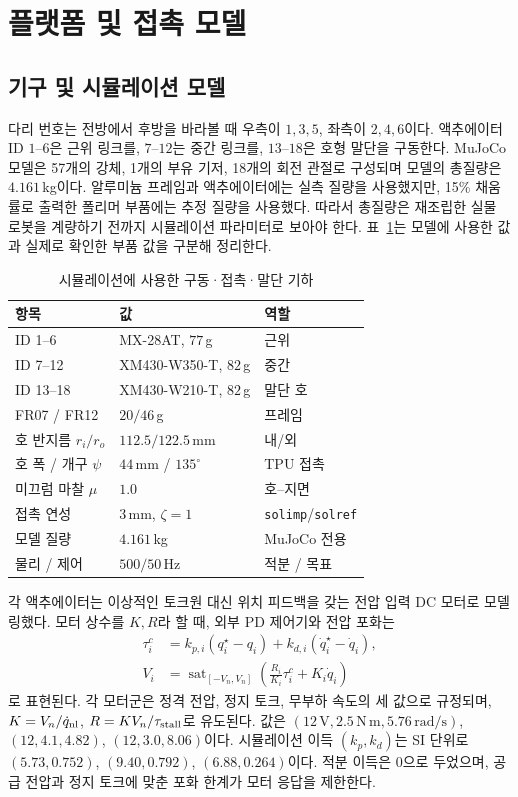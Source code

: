 \section{플랫폼 및 접촉 모델}

\subsection{기구 및 시뮬레이션 모델}

다리 번호는 전방에서 후방을 바라볼 때 우측이 $1,3,5$, 좌측이 $2,4,6$이다.
액추에이터 ID $1$--$6$은 근위 링크를, $7$--$12$는 중간 링크를, $13$--$18$은
호형 말단을 구동한다. MuJoCo 모델은 57개의 강체, 1개의 부유 기저, 18개의 회전
관절로 구성되며 모델의 총질량은 $4.161\,$kg이다. 알루미늄 프레임과 액추에이터에는
실측 질량을 사용했지만, 15\% 채움률로 출력한 폴리머 부품에는 추정 질량을
사용했다. 따라서 총질량은 재조립한 실물 로봇을 계량하기 전까지 시뮬레이션
파라미터로 보아야 한다. 표~\ref{tab:hardware-ko}는 모델에 사용한 값과 실제로
확인한 부품 값을 구분해 정리한다.

\begin{table}[t]
\caption{시뮬레이션에 사용한 구동·접촉·말단 기하}
\label{tab:hardware-ko}
\centering\footnotesize
\setlength{\tabcolsep}{5pt}
\begin{tabular}{@{}lll@{}}
\toprule
항목 & 값 & 역할\\
\midrule
ID 1--6 & MX-28AT, $77\,$g & 근위\\
ID 7--12 & XM430-W350-T, $82\,$g & 중간\\
ID 13--18 & XM430-W210-T, $82\,$g & 말단 호\\
FR07 / FR12 & $20/46\,$g & 프레임\\
호 반지름 $r_i/r_o$ & $112.5/122.5\,$mm & 내/외\\
호 폭 / 개구 $\psi$ & $44\,$mm / $135^\circ$ & TPU 접촉\\
미끄럼 마찰 $\mu$ & $1.0$ & 호--지면\\
접촉 연성 & $3\,$mm, $\zeta=1$ & \texttt{solimp}/\texttt{solref}\\
모델 질량 & $4.161\,$kg & MuJoCo 전용\\
물리 / 제어 & $500/50\,$Hz & 적분 / 목표\\
\bottomrule
\end{tabular}
\end{table}

각 액추에이터는 이상적인 토크원 대신 위치 피드백을 갖는 전압 입력 DC 모터로
모델링했다. 모터 상수를 $K,R$라 할 때, 외부 PD 제어기와 전압 포화는
\begin{align}
 \tau_i^c &= k_{p,i}(q_i^\star-q_i)+k_{d,i}(\dot q_i^\star-\dot q_i), \label{eq:pd-ko}\\
 V_i &= \operatorname{sat}_{[-V_n,V_n]}
 \left(\frac{R_i}{K_i}\tau_i^c+K_i\dot q_i\right)             \label{eq:dcmotor-ko}
\end{align}
로 표현된다. 각 모터군은 정격 전압, 정지 토크, 무부하 속도의 세 값으로 규정되며,
$K=V_n/\dot q_{\rm nl}$, $R=KV_n/\tau_{\rm stall}$로 유도된다.
값은 $(12\,\mathrm{V},2.5\,\mathrm{N\,m},5.76\,\mathrm{rad/s})$, $(12,4.1,4.82)$,
$(12,3.0,8.06)$이다. 시뮬레이션 이득 $(k_p,k_d)$는 SI 단위로 $(5.73,0.752)$,
$(9.40,0.792)$, $(6.88,0.264)$이다. 적분 이득은 0으로 두었으며, 공급 전압과 정지
토크에 맞춘 포화 한계가 모터 응답을 제한한다.

